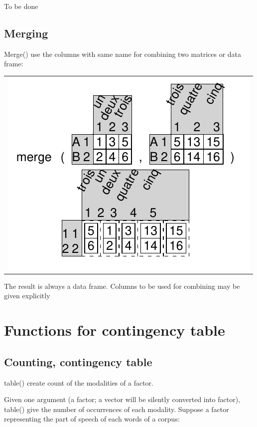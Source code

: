 \documentclass[pdflatex]{article}
\begin{document}
To be done


% 

\subsection{Merging}

Merge() use the columns with same name for combining two matrices or data frame:

\begin{tabular}{c}
\includegraphics{merge.pdf}
\end{tabular}

The result is always a data frame. Columns to be used for combining may be
given explicitly

\section{Functions for contingency table}

\subsection{Counting, contingency table}

table() create count of the modalities of a factor. 

Given one argument (a factor; a vector will be silently converted into factor), table() give the number of occurrences of each modality. Suppose a factor representing the part of speech of each words of a corpus:
\end{document}
